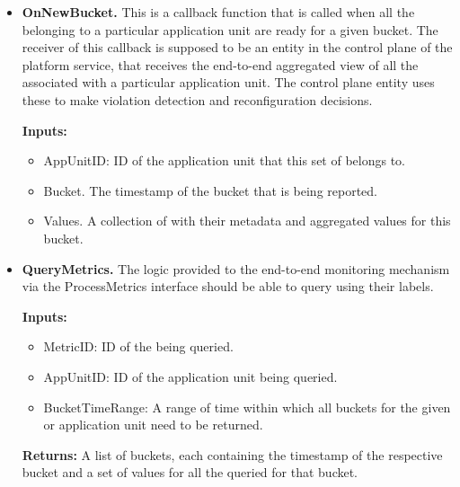 \begin{itemize}
\item \textbf{OnNewBucket.} This is a callback function that is called when  all the  belonging to a particular application unit are ready for a given bucket. The receiver of this callback is supposed to be an entity in the control plane of the platform service, that receives the end-to-end aggregated view of all the  associated with a particular application unit. The control plane entity uses these  to make violation detection and reconfiguration decisions.
\par \noindent \textbf{Inputs:}
\begin{itemize}
\item AppUnitID: ID of the application unit that this set of  belongs to.
\item Bucket. The timestamp of the bucket that is being reported.
\item Values. A collection of  with their metadata and aggregated values for this bucket.
\end{itemize}
\item \textbf{QueryMetrics. }The logic provided to the end-to-end monitoring mechanism via the ProcessMetrics interface should be able to query  using their labels. 
\par \noindent \textbf{Inputs:}
\begin{itemize}
\item MetricID: ID of the  being queried.
\item AppUnitID: ID of the application unit being queried.
\item BucketTimeRange: A range of time within which all buckets for the given  or application unit need to be returned.
\end{itemize}
\par \noindent \textbf{Returns:} A list of buckets, each containing the timestamp of the respective bucket and a set of values for all the queried  for that bucket.

\end{itemize}


